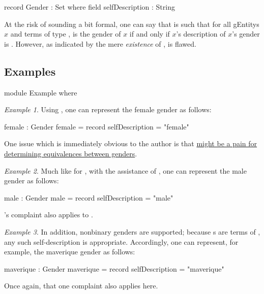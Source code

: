 \documentclass{article}
\theoremstyle{remark}
\newtheorem{example}{Example}
\begin{document}
\begin{code}
  record Gender : Set where
    field
      selfDescription : String
\end{code}

At the risk of sounding a bit formal, one can say that  is such that for all \glspl{gEntity} \(x\) and terms  of type ,  is the gender of \(x\) if and only if \(x\)'s description of \(x\)'s gender is  .  However, as indicated by the mere \emph{existence} of ,  is flawed.

\subsection{Examples}

\begin{code}
  module Example where
\end{code}

\begin{example}\label{example:gender1exampleFemale}
  Using , one can represent the female gender as follows:

  \begin{code}
    female : Gender
    female = record {selfDescription = "female"}
  \end{code}

  One issue which is immediately obvious to the author is that \hyperref[enum:gender1stringComparison]{ might be a pain for determining equivalences between genders}.
\end{example}

\begin{example}
  Much like for , with the assistance of , one can represent the male gender as follows:

  \begin{code}
    male : Gender
    male = record {selfDescription = "male"}
\end{code}

's  complaint also applies to .
\end{example}

\begin{example}
  In addition, nonbinary genders are supported; because s are terms of , any such self-description is appropriate.  Accordingly, one can represent, for example, the maverique gender\cite{nonbinaryWikiMaverique} as follows:

  \begin{code}
    maverique : Gender
    maverique = record {selfDescription = "maverique"}
  \end{code}

Once again, that one  complaint also applies here.
\end{example}
\end{document}
